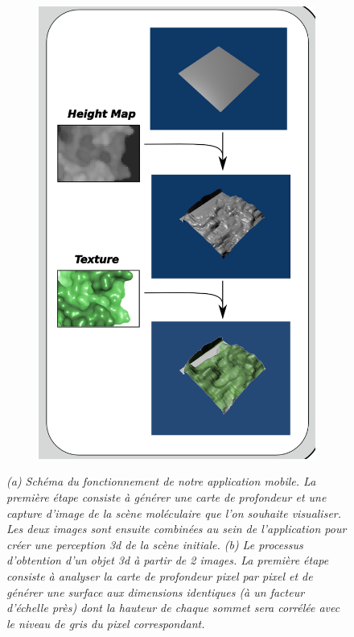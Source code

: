 \begin{figure}
\begin{subfigure}{.5\textwidth}
  {\includegraphics[width=.75\linewidth]{./figures/ch3/heightmap_texture_unity}}
    \caption{}
  \label{Fig:heightmap_texture_unity}
\end{subfigure}

\caption{{\it (a) Schéma du fonctionnement de notre application mobile. La première étape consiste à générer une carte de profondeur et une capture d'image de la scène moléculaire que l'on souhaite visualiser. Les deux images sont ensuite combinées au sein de l'application pour créer une perception 3d de la scène initiale.
(b) Le processus d'obtention d'un objet 3d à partir de 2 images. La première étape consiste à analyser la carte de profondeur pixel par pixel et de générer une surface aux dimensions identiques (à un facteur d'échelle près) dont la hauteur de chaque sommet sera corrélée avec le niveau de gris du pixel correspondant.}}
\end{figure}

